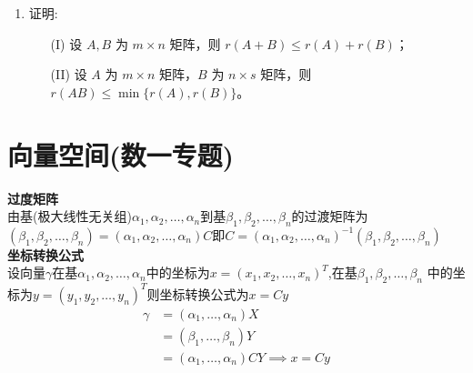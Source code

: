 \documentclass[12pt, a4paper, oneside, UTF8]{ctexbook}
\begin{document}
\begin{enumerate}
    \item 证明:
    \begin{enumerate}
        \item [(I)] 设 $A, B$ 为 $m \times n$ 矩阵，则 $r(A+B) \leq r(A) + r(B)$；
        \item [(II)] 设 $A$ 为 $m \times n$ 矩阵，$B$ 为 $n \times s$ 矩阵，则 $r(AB) \leq \min\{r(A), r(B)\}$。
    \end{enumerate}
    
    \begin{solution}
    \newpage
    \end{solution}
\end{enumerate}

\section{向量空间(数一专题)}
\begin{remark}[向量空间]
    \textbf{过度矩阵} \\
    由基(极大线性无关组)$\alpha_1,\alpha_2,\ldots,\alpha_n$到基$\beta_1,\beta_2,\ldots,\beta_n$的过渡矩阵为$(\beta_1,\beta_2,\ldots,\beta_n)
    =(\alpha_1,\alpha_2,\ldots,\alpha_n)C$即$C=(\alpha_1,\alpha_2,\ldots,\alpha_n)^{-1}(\beta_1,\beta_2,\ldots,\beta_n)$ \\
    \textbf{坐标转换公式} \\
    设向量$\gamma$在基$\alpha_1,\alpha_2,\ldots,\alpha_n$中的坐标为$x=(x_1,x_2,\ldots,x_n)^{T}$,在基$\beta_1,\beta_2,\ldots,\beta_n$
    中的坐标为$y=(y_1,y_2,\ldots,y_n)^{T}$则坐标转换公式为$x=Cy$
    \begin{align*}
        \gamma &= (\alpha_1,\ldots,\alpha_n)X \\
        &=(\beta_1,\ldots,\beta_n)Y \\
        &=(\alpha_1,\ldots,\alpha_n)CY \implies x = Cy
    \end{align*}
\end{remark}
\end{document}
